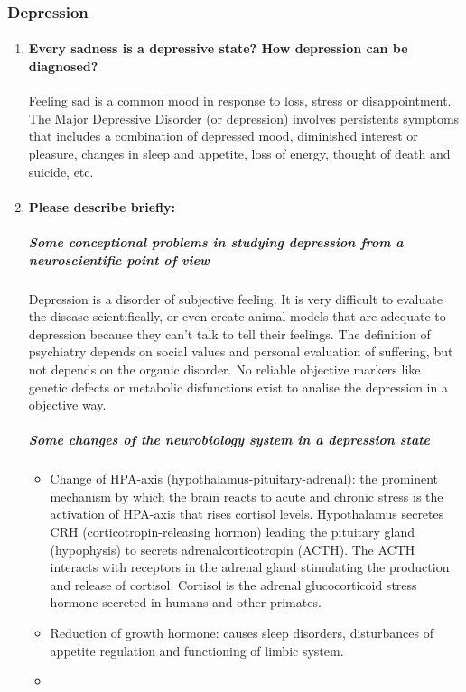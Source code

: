 \documentclass[12pt,article,oneside,a4paper]{memoir}
\begin{document}
\subsubsection{Depression}
\begin{enumerate}
\item \paragraph{Every sadness is a depressive state? How depression can be
diagnosed?}

Feeling sad is a common mood in response to loss, stress or disappointment.
The Major Depressive Disorder (or depression) involves persistents symptoms
that includes a combination of depressed mood, diminished interest or pleasure,
changes in sleep and appetite, loss of energy, thought of death and suicide,
etc.

\item \paragraph{Please describe briefly:}
\subparagraph{Some conceptional problems in studying depression from a
neuroscientific point of view} 

Depression is a disorder of subjective feeling. It is very difficult to
evaluate the disease scientifically, or even create animal models that are
adequate to depression because they can't talk to tell their feelings. The
definition of psychiatry depends on social values and personal evaluation of
suffering, but not depends on the organic disorder. No reliable objective
markers like genetic defects or metabolic disfunctions exist to analise the
depression in a objective way.

\subparagraph{Some changes of the neurobiology system in a depression state}
\label{question:neurobiology-depression}
\begin{itemize}
\item Change of HPA-axis (hypothalamus-pituitary-adrenal): the prominent
mechanism by which the brain reacts to acute and chronic stress is the
activation of HPA-axis that rises cortisol levels. Hypothalamus secretes CRH
(corticotropin-releasing hormon) leading the pituitary gland (hypophysis) to
secrets adrenalcorticotropin (ACTH). The ACTH interacts with receptors in the
adrenal gland stimulating the production and release of cortisol. Cortisol is
the adrenal glucocorticoid stress hormone secreted in humans and other
primates.
\item Reduction of growth hormone: causes sleep disorders, disturbances of
appetite regulation and functioning of limbic system.
\item 
\end{itemize}


\end{enumerate}
\end{document}
